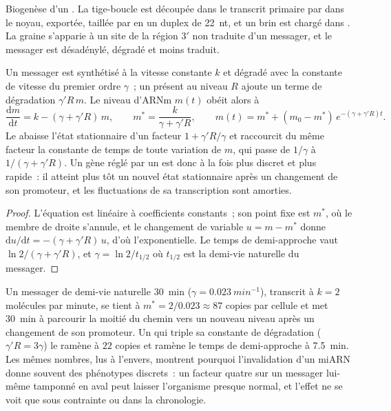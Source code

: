 \begin{omfigure}
{\small Biogenèse d'un . La tige-boucle est découpée dans le
transcrit primaire par  dans le noyau, exportée, taillée par
 en un duplex de \qty{22}{nt}, et un brin est chargé dans
. La graine s'apparie à un site de la région 3$'$ non traduite
d'un messager, et le messager est désadénylé, dégradé et moins traduit.}
\end{omfigure}

\begin{theorem}\label{thm:b3:rna-regulation:mirna-kinetics}
Un messager est synthétisé à la vitesse constante $k$ et dégradé avec
la constante de vitesse du premier ordre $\gamma$~; un  présent
au niveau $R$ ajoute un terme de dégradation $\gamma' R\, m$. Le niveau
d'ARNm $m(t)$ obéit alors à
\[
\frac{\mathrm{d}m}{\mathrm{d}t} = k - (\gamma + \gamma' R)\, m,
\qquad
m^{*} = \frac{k}{\gamma + \gamma' R},
\qquad
m(t) = m^{*} + (m_{0} - m^{*})\,e^{-(\gamma + \gamma' R)t}.
\]
Le  abaisse l'état stationnaire d'un facteur $1 + \gamma' R/
\gamma$ et raccourcit du même facteur la constante de temps de toute
variation de $m$, qui passe de $1/\gamma$ à $1/(\gamma + \gamma' R)$.
Un gène réglé par un  est donc à la fois plus discret et plus
rapide~: il atteint plus tôt un nouvel état stationnaire après un
changement de son promoteur, et les fluctuations de sa transcription
sont amorties.
\end{theorem}
\begin{proof}
L'équation est linéaire à coefficients constants~; son point fixe est
$m^{*}$, où le membre de droite s'annule, et le changement de variable
$u = m - m^{*}$ donne $\mathrm{d}u/\mathrm{d}t = -(\gamma + \gamma' R)\,u$,
d'où l'exponentielle. Le temps de demi-approche vaut $\ln 2/(\gamma + \gamma'
R)$, et $\gamma = \ln 2 / t_{1/2}$ où $t_{1/2}$ est la demi-vie
naturelle du messager.
\end{proof}

\begin{example}\label{ex:b3:rna-regulation:fourfold}
Un messager de demi-vie naturelle \qty{30}{min} ($\gamma =
\qty{0.023}{min^{-1}}$), transcrit à $k = 2$ molécules par minute, se
tient à $m^{*} = 2/0.023 \approx 87$ copies par cellule et met
\qty{30}{min} à parcourir la moitié du chemin vers un nouveau niveau
après un changement de son promoteur. Un  qui triple sa
constante de dégradation ($\gamma' R = 3\gamma$) le ramène à $22$
copies et ramène le temps de demi-approche à \qty{7.5}{min}. Les mêmes
nombres, lus à l'envers, montrent pourquoi l'invalidation d'un miARN
donne souvent des phénotypes discrets~: un facteur quatre sur un
messager lui-même tamponné en aval peut laisser l'organisme presque
normal, et l'effet ne se voit que sous contrainte ou dans la
chronologie.
\end{example}

